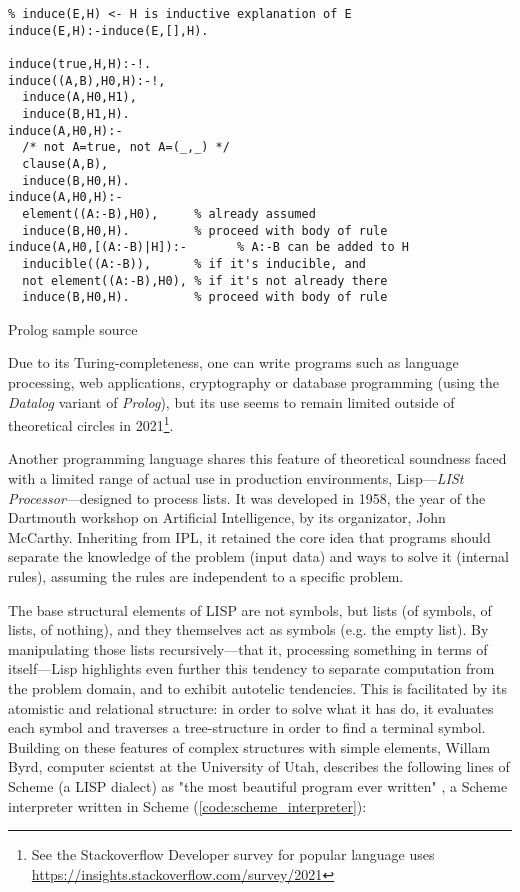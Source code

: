 \begin{listing}
  \begin{verbatim}
% induce(E,H) <- H is inductive explanation of E
induce(E,H):-induce(E,[],H).

induce(true,H,H):-!.
induce((A,B),H0,H):-!,
  induce(A,H0,H1),
  induce(B,H1,H).
induce(A,H0,H):-
  /* not A=true, not A=(_,_) */
  clause(A,B),
  induce(B,H0,H).
induce(A,H0,H):-
  element((A:-B),H0),     % already assumed
  induce(B,H0,H).         % proceed with body of rule
induce(A,H0,[(A:-B)|H]):-       % A:-B can be added to H
  inducible((A:-B)),      % if it's inducible, and
  not element((A:-B),H0), % if it's not already there
  induce(B,H0,H).         % proceed with body of rule

\end{verbatim}
  \caption{Prolog sample source}
  \label{code:prolog_sample}
\end{listing}

Due to its Turing-completeness, one can write programs such as language processing, web applications, cryptography or database programming (using the \emph{Datalog} variant of \emph{Prolog}), but its use seems to remain limited outside of theoretical circles in 2021\footnote{See the Stackoverflow Developer survey for popular language uses \url{https://insights.stackoverflow.com/survey/2021}}.

Another programming language shares this feature of theoretical soundness faced with a limited range of actual use in production environments, Lisp—\emph{LISt Processor}—designed to process lists. It was developed in 1958, the year of the Dartmouth workshop on Artificial Intelligence, by its organizator, John McCarthy. Inheriting from IPL, it retained the core idea that programs should separate the knowledge of the problem (input data) and ways to solve it (internal rules), assuming  the rules are independent to a specific problem.

The base structural elements of LISP are not symbols, but lists (of symbols, of lists, of nothing), and they themselves act as symbols (e.g. the empty list). By manipulating those lists recursively—that it, processing something in terms of itself—Lisp highlights even further this tendency to separate computation from the problem domain, and to exhibit autotelic tendencies. This is facilitated by its atomistic and relational structure: in order to solve what it has do, it evaluates each symbol and traverses a tree-structure in order to find a terminal symbol. Building on these features of complex structures with simple elements, Willam Byrd, computer scientst at the University of Utah, describes the following lines of Scheme (a LISP dialect) as "the most beautiful program ever written" \citep{byrd_william_2017}, a Scheme interpreter written in Scheme (\ref{code:scheme_interpreter}):

